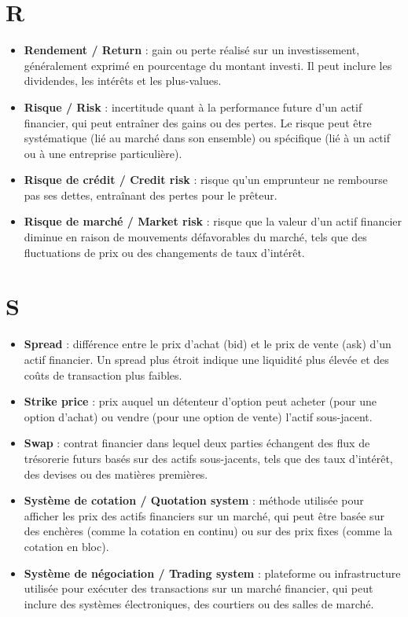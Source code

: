 \documentclass[a4paper,10pt]{article}
\begin{document}
\begin{multicols}{2}
\section*{R}
\begin{itemize}
  \item \textbf{Rendement / Return} : gain ou perte réalisé sur un investissement, généralement exprimé en pourcentage du montant investi. Il peut inclure les dividendes, les intérêts et les plus-values.
  \item \textbf{Risque / Risk} : incertitude quant à la performance future d’un actif financier, qui peut entraîner des gains ou des pertes. Le risque peut être systématique (lié au marché dans son ensemble) ou spécifique (lié à un actif ou à une entreprise particulière).
  \item \textbf{Risque de crédit / Credit risk} : risque qu’un emprunteur ne rembourse pas ses dettes, entraînant des pertes pour le prêteur.
  \item \textbf{Risque de marché / Market risk} : risque que la valeur d’un actif financier diminue en raison de mouvements défavorables du marché, tels que des fluctuations de prix ou des changements de taux d’intérêt.
\end{itemize}

\section*{S}
\begin{itemize}
  \item \textbf{Spread} : différence entre le prix d’achat (bid) et le prix de vente (ask) d’un actif financier. Un spread plus étroit indique une liquidité plus élevée et des coûts de transaction plus faibles.
  \item \textbf{Strike price} : prix auquel un détenteur d’option peut acheter (pour une option d’achat) ou vendre (pour une option de vente) l’actif sous-jacent.
  \item \textbf{Swap} : contrat financier dans lequel deux parties échangent des flux de trésorerie futurs basés sur des actifs sous-jacents, tels que des taux d’intérêt, des devises ou des matières premières.
  \item \textbf{Système de cotation / Quotation system} : méthode utilisée pour afficher les prix des actifs financiers sur un marché, qui peut être basée sur des enchères (comme la cotation en continu) ou sur des prix fixes (comme la cotation en bloc).
  \item \textbf{Système de négociation / Trading system} : plateforme ou infrastructure utilisée pour exécuter des transactions sur un marché financier, qui peut inclure des systèmes électroniques, des courtiers ou des salles de marché.
\end{itemize}


\end{multicols}
\end{document}
